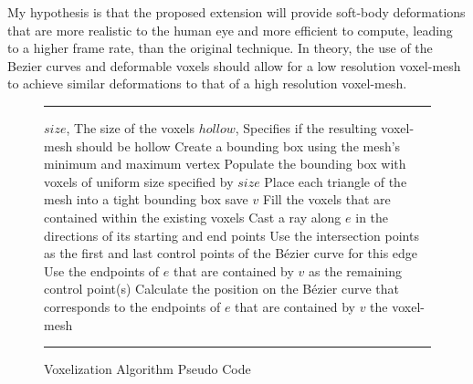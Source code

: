 My hypothesis is that the proposed extension will provide soft-body deformations that are more
realistic to the human eye and more efficient to compute, leading to a higher frame rate, than the 
original technique. In theory, the use of the
Bezier curves and deformable voxels should allow for a low resolution voxel-mesh to achieve similar
deformations to that of a high resolution voxel-mesh.

\begin{figure}
  \hrule
  \vspace{6pt}
  \begin{algorithmic}
  \REQUIRE $size$, The size of the voxels
  \REQUIRE $hollow$, Specifies if the resulting voxel-mesh should be hollow
  \STATE Create a bounding box using the mesh's minimum and maximum vertex
  \STATE Populate the bounding box with voxels of uniform size specified by $size$
  \STATE Place each triangle of the mesh into a tight bounding box
          \STATE save $v$
      \ENDIF
  \ENDFOR
          \STATE Fill the voxels that are contained within the existing voxels
      \ENDFOR
  \ENDIF
          \STATE Cast a ray along $e$ in the directions of its starting and end points
          \STATE Use the intersection points as the first and last control points of the Bézier curve for this edge
          \STATE Use the endpoints of $e$ that are contained by $v$ as the remaining control point(s)
          \STATE Calculate the position on the Bézier curve that corresponds to the endpoints of $e$ that are contained by $v$
      \ENDFOR
  \ENDFOR
  \RETURN the voxel-mesh
  \end{algorithmic}
  \hrule
  \vspace{6pt}
  \caption{Voxelization Algorithm Pseudo Code}
 \label{fig:VoxelizationAlgorithm}
\end{figure}



